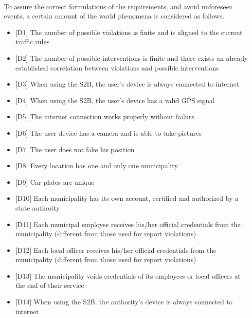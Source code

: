 			\paragraph{}
				To assure the correct formulations of the requirements, and avoid unforeseen events, a certain amount of the world phenomena is considered as follows.
				\begin{itemize}
					\item {[D1]} The number of possible violations is finite and is aligned to the current traffic rules
					\item {[D2]} The number of possible interventions is finite and there exists an already established correlation between violations and possible interventions
					\item {[D3]} When using the S2B, the user's device is always connected to internet
					\item {[D4]} When using the S2B, the user's device has a valid GPS signal
					\item {[D5]} The internet connection works properly without failure
					\item {[D6]} The user device has a camera and is able to take pictures
					\item {[D7]} The user does not fake his position
					\item {[D8]} Every location has one and only one municipality
					\item {[D9]} Car plates are unique
					\item {[D10]} Each municipality has its own account, certified and authorized by a state authority
					\item {[D11]} Each municipal employee receives his/her official credentials from the municipality (different from those used for report violations)
					\item {[D12]} Each local officer receives his/her official credentials from the municipality (different from those used for report violations)
					\item {[D13]} The municipality voids credentials of its employees or local officers at the end of their service
					\item {[D14]} When using the S2B, the authority's device is always connected to internet
				\end{itemize}